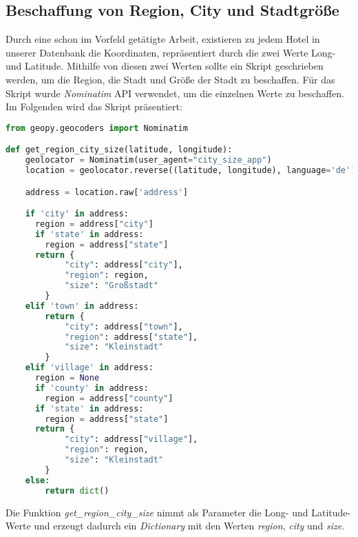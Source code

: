 \subsection{Beschaffung von Region, City und Stadtgröße}
\label{subsubsec:region_city_size}
Durch eine schon im Vorfeld getätigte Arbeit, existieren zu jedem Hotel in unserer Datenbank die Koordinaten, repräsentiert durch die zwei Werte Long- und Latitude. Mithilfe von diesen zwei Werten sollte ein Skript geschrieben werden, um die Region, die Stadt und Größe der Stadt zu beschaffen. 
\newline
\newline
Für das Skript wurde \emph{Nominatim} API verwendet, um die einzelnen Werte zu beschaffen. Im Folgenden wird das Skript präsentiert:

\begin{lstlisting}[language=Python, label=lst:RS_Demo, caption=Einfaches Recommendation System für Film vorschläge]
    from geopy.geocoders import Nominatim

def get_region_city_size(latitude, longitude):
    geolocator = Nominatim(user_agent="city_size_app")
    location = geolocator.reverse((latitude, longitude), language='de')

    address = location.raw['address']

    if 'city' in address:
      region = address["city"]
      if 'state' in address:
        region = address["state"]
      return {
            "city": address["city"],
            "region": region,
            "size": "Großstadt"
        }
    elif 'town' in address:
        return {
            "city": address["town"],
            "region": address["state"],
            "size": "Kleinstadt"
        }
    elif 'village' in address:
      region = None
      if 'county' in address:
        region = address["county"]
      if 'state' in address:
        region = address["state"]
      return {
            "city": address["village"],
            "region": region,
            "size": "Kleinstadt"
        }
    else:
        return dict()
\end{lstlisting}

Die Funktion \emph{get\_region\_city\_size} nimmt als Parameter die Long- und Latitude-Werte und erzeugt dadurch ein \emph{Dictionary} mit den Werten \emph{region}, \emph{city} und \emph{size}.